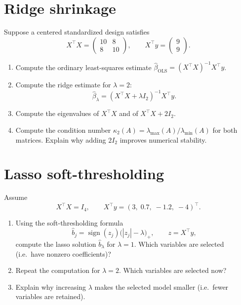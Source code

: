 \documentclass[12pt,a4paper]{article}
\begin{document}
\bigskip

\section{Ridge shrinkage}

Suppose a centered standardized design satisfies
$$
  X^\top X =
  \begin{pmatrix}
  10 & 8 \\
  8  & 10
  \end{pmatrix},
  \qquad
  X^\top y =
  \begin{pmatrix}
  9 \\
  9
  \end{pmatrix}.
$$

\begin{enumerate}[label=(\alph*)]
  \item Compute the ordinary least-squares estimate
        $\widehat\beta_{\mathrm{OLS}} = (X^\top X)^{-1} X^\top y$.

  \item Compute the ridge estimate for $\lambda = 2$:
        $$
          \widehat\beta_{\lambda} = (X^\top X + \lambda I_2)^{-1} X^\top y.
        $$

  \item Compute the eigenvalues of $X^\top X$ and of
        $X^\top X + 2I_2$.

  \item Compute the condition number
        $\kappa_2(A) = \lambda_{\max}(A) / \lambda_{\min}(A)$
        for both matrices. Explain why adding $2I_2$ improves numerical
        stability.
\end{enumerate}

\bigskip

\section{Lasso soft-thresholding}

Assume
$$
  X^\top X = I_4,
  \qquad
  X^\top y = (3,\; 0.7,\; -1.2,\; -4)^\top.
$$

\begin{enumerate}[label=(\alph*)]
  \item Using the soft-thresholding formula
        $$
          \widehat b_j
          = \operatorname{sign}(z_j)\bigl(|z_j| - \lambda\bigr)_+,
          \qquad
          z = X^\top y,
        $$
        compute the lasso solution $\widehat b_{\lambda}$ for $\lambda = 1$.
        Which variables are selected (i.e.\ have nonzero coefficients)?

  \item Repeat the computation for $\lambda = 2$.
        Which variables are selected now?

  \item Explain why increasing $\lambda$ makes the selected model smaller
        (i.e.\ fewer variables are retained).
\end{enumerate}
\end{document}
